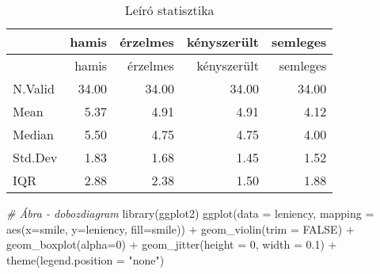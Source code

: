\documentclass[
]{book}
\newenvironment{Shaded}{\begin{snugshade}}{\end{snugshade}}
\newcommand{\AttributeTok}[1]{\textcolor[rgb]{0.77,0.63,0.00}{#1}}
\newcommand{\CommentTok}[1]{\textcolor[rgb]{0.56,0.35,0.01}{\textit{#1}}}
\newcommand{\ConstantTok}[1]{\textcolor[rgb]{0.00,0.00,0.00}{#1}}
\newcommand{\DecValTok}[1]{\textcolor[rgb]{0.00,0.00,0.81}{#1}}
\newcommand{\FloatTok}[1]{\textcolor[rgb]{0.00,0.00,0.81}{#1}}
\newcommand{\FunctionTok}[1]{\textcolor[rgb]{0.00,0.00,0.00}{#1}}
\newcommand{\NormalTok}[1]{#1}
\newcommand{\SpecialCharTok}[1]{\textcolor[rgb]{0.00,0.00,0.00}{#1}}
\newcommand{\StringTok}[1]{\textcolor[rgb]{0.31,0.60,0.02}{#1}}
\begin{document}
\begin{Shaded}
\end{Shaded}

\begin{longtable}[]{@{}lrrrr@{}}
\caption{Leíró statisztika}\tabularnewline
\toprule
& hamis & érzelmes & kényszerült & semleges \\
\midrule
\endfirsthead
\toprule
& hamis & érzelmes & kényszerült & semleges \\
\midrule
\endhead
N.Valid & 34.00 & 34.00 & 34.00 & 34.00 \\
Mean & 5.37 & 4.91 & 4.91 & 4.12 \\
Median & 5.50 & 4.75 & 4.75 & 4.00 \\
Std.Dev & 1.83 & 1.68 & 1.45 & 1.52 \\
IQR & 2.88 & 2.38 & 1.50 & 1.88 \\
\bottomrule
\end{longtable}

\begin{Shaded}
\begin{Highlighting}[]
\CommentTok{\# Ábra {-} dobozdiagram}
\FunctionTok{library}\NormalTok{(ggplot2)}
\FunctionTok{ggplot}\NormalTok{(}\AttributeTok{data =}\NormalTok{ leniency, }\AttributeTok{mapping =} \FunctionTok{aes}\NormalTok{(}\AttributeTok{x=}\NormalTok{smile, }\AttributeTok{y=}\NormalTok{leniency, }\AttributeTok{fill=}\NormalTok{smile)) }\SpecialCharTok{+} 
  \FunctionTok{geom\_violin}\NormalTok{(}\AttributeTok{trim =} \ConstantTok{FALSE}\NormalTok{) }\SpecialCharTok{+} 
  \FunctionTok{geom\_boxplot}\NormalTok{(}\AttributeTok{alpha=}\DecValTok{0}\NormalTok{) }\SpecialCharTok{+} 
  \FunctionTok{geom\_jitter}\NormalTok{(}\AttributeTok{height =} \DecValTok{0}\NormalTok{, }\AttributeTok{width =} \FloatTok{0.1}\NormalTok{) }\SpecialCharTok{+} 
  \FunctionTok{theme}\NormalTok{(}\AttributeTok{legend.position =} \StringTok{"none"}\NormalTok{)}
\end{Highlighting}
\end{Shaded}
\end{document}
